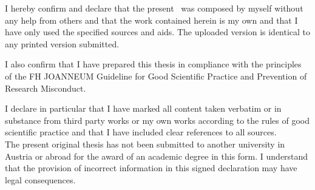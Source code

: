 %


	\thispagestyle{empty}
	
	{\hfill\fontfamily{\sfdefault}\bfseries\fontsize{22}{22}\selectfont{Obligatory declaration}}\vspace*{1cm}
	
	\begin{customquote}

	\noindent I hereby confirm and declare that the present \DocTypeText ~was composed by myself without any help from others and that the work contained herein is my own and that I have only used the specified sources and aids. The uploaded version is identical to any printed version submitted.
	
	\noindent I also confirm that I have prepared this thesis in compliance with the principles of the FH JOANNEUM Guideline for Good Scientific Practice and Prevention of Research Misconduct.
	
	\noindent I declare in particular that I have marked all content taken verbatim or in substance from third party works or my own works according to the rules of good scientific practice and that I have included clear references to all sources.\\
	\noindent The present original thesis has not been submitted to another university in Austria or abroad for the award of an academic degree in this form.
	I understand that the provision of incorrect information in this signed declaration may have legal consequences.
	\end{customquote}
	
	\ifthenelse{\equal{\Style}{\Book}}
	{
		\newpage
		\thispagestyle{empty}	
	}
	

